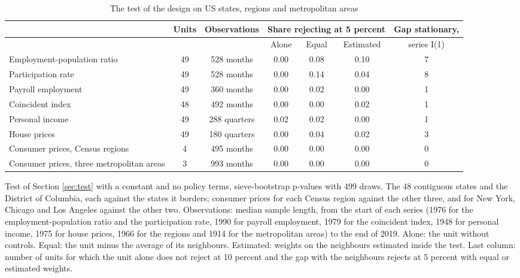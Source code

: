 \begin{table}[htbp]
\centering
\caption{The test of the design on US states, regions and metropolitan areas\label{tab:screen}}
\footnotesize
\setlength{\tabcolsep}{4pt}
\begin{tabular}{>{\raggedright\arraybackslash}p{4.2cm}cccccc}
\toprule
 & Units & Observations & \multicolumn{3}{c}{Share rejecting at 5 percent} & Gap stationary, \\
\cmidrule(lr){4-6}
 & & & Alone & Equal & Estimated & series I(1) \\
\midrule
Employment-population ratio & 49 & 528 months & 0.00 & 0.08 & 0.10 & 7 \\
Participation rate & 49 & 528 months & 0.00 & 0.14 & 0.04 & 8 \\
Payroll employment & 49 & 360 months & 0.00 & 0.02 & 0.00 & 1 \\
Coincident index & 48 & 492 months & 0.00 & 0.00 & 0.02 & 1 \\
Personal income & 49 & 288 quarters & 0.02 & 0.02 & 0.00 & 1 \\
House prices & 49 & 180 quarters & 0.00 & 0.04 & 0.02 & 3 \\
Consumer prices, Census regions & 4 & 495 months & 0.00 & 0.00 & 0.00 & 0 \\
Consumer prices, three metropolitan areas & 3 & 993 months & 0.00 & 0.00 & 0.00 & 0 \\
\bottomrule
\end{tabular}
\par\smallskip\parbox{0.95\textwidth}{\footnotesize Test of Section \ref{sec:test} with a constant and no policy terms, sieve-bootstrap p-values with 499 draws. The 48 contiguous states and the District of Columbia, each against the states it borders; consumer prices for each Census region against the other three, and for New York, Chicago and Los Angeles against the other two. Observations: median sample length, from the start of each series (1976 for the employment-population ratio and the participation rate, 1990 for payroll employment, 1979 for the coincident index, 1948 for personal income, 1975 for house prices, 1966 for the regions and 1914 for the metropolitan areas) to the end of 2019. Alone: the unit without controls. Equal: the unit minus the average of its neighbours. Estimated: weights on the neighbours estimated inside the test. Last column: number of units for which the unit alone does not reject at 10 percent and the gap with the neighbours rejects at 5 percent with equal or estimated weights.}
\end{table}
